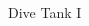 \documentclass{beamer}
\begin{document}
\begin{frame}[t]{Dive Tank I}
\begin{columns}[T]
\begin{column}{0.5\textwidth}
\begin{center}
				\end{center}
			\end{column}
		\end{columns}
	\end{frame}
\end{document}
